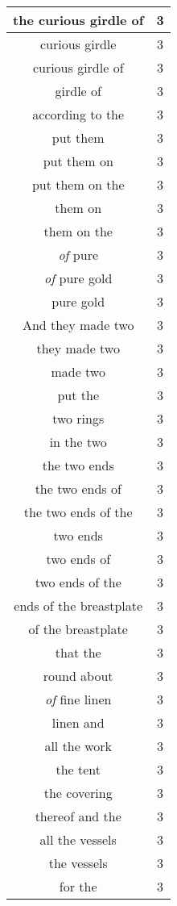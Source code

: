 \begin{center}
\begin{longtable}{|c|c|}
the curious girdle of & 3\\ \hline 
curious girdle & 3\\ \hline 
curious girdle of & 3\\ \hline 
girdle of & 3\\ \hline 
according to the & 3\\ \hline 
put them & 3\\ \hline 
put them on & 3\\ \hline 
put them on the & 3\\ \hline 
them on & 3\\ \hline 
them on the & 3\\ \hline 
\emph{of} pure & 3\\ \hline 
\emph{of} pure gold & 3\\ \hline 
pure gold & 3\\ \hline 
And they made two & 3\\ \hline 
they made two & 3\\ \hline 
made two & 3\\ \hline 
put the & 3\\ \hline 
two rings & 3\\ \hline 
in the two & 3\\ \hline 
the two ends & 3\\ \hline 
the two ends of & 3\\ \hline 
the two ends of the & 3\\ \hline 
two ends & 3\\ \hline 
two ends of & 3\\ \hline 
two ends of the & 3\\ \hline 
ends of the breastplate & 3\\ \hline 
of the breastplate & 3\\ \hline 
that the & 3\\ \hline 
round about & 3\\ \hline 
\emph{of} fine linen & 3\\ \hline 
linen and & 3\\ \hline 
all the work & 3\\ \hline 
the tent & 3\\ \hline 
the covering & 3\\ \hline 
thereof and the & 3\\ \hline 
all the vessels & 3\\ \hline 
the vessels & 3\\ \hline 
for the & 3\\ \hline 
\end{longtable}
\end{center}





